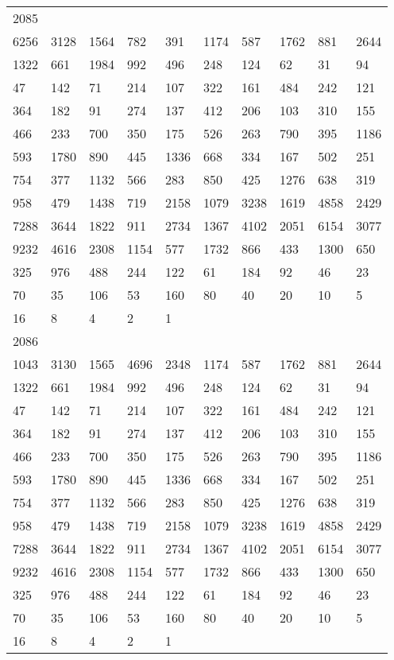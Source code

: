 \begin{longtable}{*{10}{l}}
2085&&&&&&&&&\\
6256& 3128& 1564& 782& 391& 1174& 587& 1762& 881& 2644\\
1322& 661& 1984& 992& 496& 248& 124& 62& 31& 94\\
47& 142& 71& 214& 107& 322& 161& 484& 242& 121\\
364& 182& 91& 274& 137& 412& 206& 103& 310& 155\\
466& 233& 700& 350& 175& 526& 263& 790& 395& 1186\\
593& 1780& 890& 445& 1336& 668& 334& 167& 502& 251\\
754& 377& 1132& 566& 283& 850& 425& 1276& 638& 319\\
958& 479& 1438& 719& 2158& 1079& 3238& 1619& 4858& 2429\\
7288& 3644& 1822& 911& 2734& 1367& 4102& 2051& 6154& 3077\\
9232& 4616& 2308& 1154& 577& 1732& 866& 433& 1300& 650\\
325& 976& 488& 244& 122& 61& 184& 92& 46& 23\\
70& 35& 106& 53& 160& 80& 40& 20& 10& 5\\
16& 8& 4& 2& 1& \\

2086&&&&&&&&&\\
1043& 3130& 1565& 4696& 2348& 1174& 587& 1762& 881& 2644\\
1322& 661& 1984& 992& 496& 248& 124& 62& 31& 94\\
47& 142& 71& 214& 107& 322& 161& 484& 242& 121\\
364& 182& 91& 274& 137& 412& 206& 103& 310& 155\\
466& 233& 700& 350& 175& 526& 263& 790& 395& 1186\\
593& 1780& 890& 445& 1336& 668& 334& 167& 502& 251\\
754& 377& 1132& 566& 283& 850& 425& 1276& 638& 319\\
958& 479& 1438& 719& 2158& 1079& 3238& 1619& 4858& 2429\\
7288& 3644& 1822& 911& 2734& 1367& 4102& 2051& 6154& 3077\\
9232& 4616& 2308& 1154& 577& 1732& 866& 433& 1300& 650\\
325& 976& 488& 244& 122& 61& 184& 92& 46& 23\\
70& 35& 106& 53& 160& 80& 40& 20& 10& 5\\
16& 8& 4& 2& 1& \\


\end{longtable}
